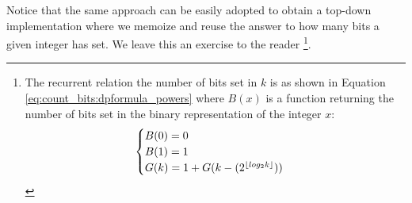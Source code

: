 Notice that the same approach can be easily adopted to obtain a top-down implementation where we memoize and reuse the answer to how many bits a given integer has set.
We leave this an exercise to the reader \footnote{The recurrent relation the number of bits set in $k$ is as shown in Equation \ref{eq:count_bits:dpformula_powers} where $B(x)$ is a function returning the number of bits set in the binary representation of the integer $x$:
\begin{equation}
	\begin{cases}
		B(0) = 0 \\
		B(1) = 1 \\
		G(k) =  1 + G(k-(2^{\lfloor log_2{k}\rfloor})) 	 \end{cases}
	\label{eq:count_bits:dpformula_powers}
\end{equation}
}.